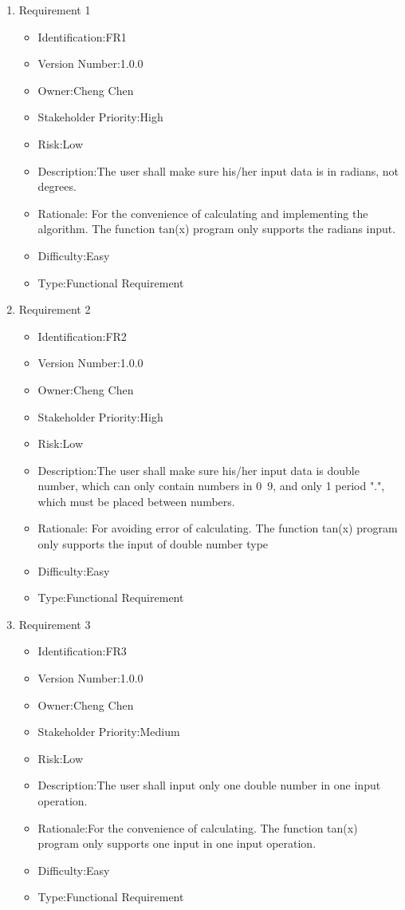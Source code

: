 \documentclass[10pt,a4paper,twoside]{article}
\begin{document}
\begin{enumerate}
\item 
Requirement 1
\begin{itemize}
\item Identification:FR1
\item Version Number:1.0.0
\item Owner:Cheng Chen
\item Stakeholder Priority:High
\item Risk:Low
\item Description:The user shall make sure his/her input data is in radians, not degrees.
\item Rationale: For the convenience of calculating and implementing the algorithm. The function tan(x) program only supports the radians input.
\item Difficulty:Easy
\item Type:Functional Requirement
\end{itemize} 

\item 
Requirement 2
\begin{itemize}
\item Identification:FR2
\item Version Number:1.0.0
\item Owner:Cheng Chen
\item Stakeholder Priority:High
\item Risk:Low
\item Description:The user shall make sure his/her input data is double number, which can only contain numbers in 0~9, and only 1 period ".", which must be placed between numbers.
\item Rationale: For avoiding error of calculating. The function tan(x) program only supports the input of double number type
\item Difficulty:Easy
\item Type:Functional Requirement
\end{itemize} 

\item 
Requirement 3
\begin{itemize}
\item Identification:FR3
\item Version Number:1.0.0
\item Owner:Cheng Chen
\item Stakeholder Priority:Medium
\item Risk:Low
\item Description:The user shall input only one double number in one input operation.
\item Rationale:For the convenience of calculating. The function tan(x) program only supports one input in one input operation.
\item Difficulty:Easy
\item Type:Functional Requirement
\end{itemize} 


\end{enumerate}
\end{document}
